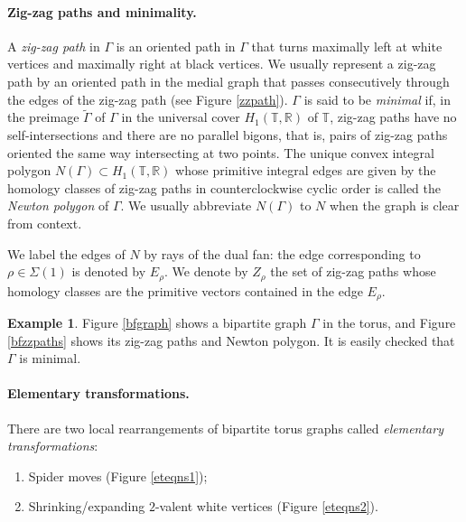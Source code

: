\documentclass[11pt]{article} %
\theoremstyle{definition}
\newtheorem{example}[theorem]{Example}
\newcommand{\R}{{\mathbb R}}
\newcommand{\T}{{\mathbb T}}
\begin{document}
\paragraph{Zig-zag paths and minimality.}
A \textit{zig-zag path} in $\Gamma$ is an oriented path in $\Gamma$ that turns maximally left at white vertices and maximally right at black vertices.  We usually represent a zig-zag path by an oriented path in the medial graph that passes consecutively through the edges of the zig-zag path (see Figure \ref{zzpath}). $\Gamma$ is said to be  \textit{minimal} if, in the preimage $\widetilde{\Gamma}$ of $\Gamma$ in the universal cover $H_1(\T,\R)$ of $\T$, zig-zag paths have no self-intersections and there are no parallel bigons, that is, pairs of zig-zag paths oriented the same way intersecting at two points. The unique convex integral polygon $N(\Gamma) \subset H_1(\mathbb T,\R)$ whose primitive integral edges are given by the homology classes of zig-zag paths in counterclockwise cyclic order is called the \textit{Newton polygon} of $\Gamma$. We usually abbreviate $N(\Gamma)$ to $N$ when the graph is clear from context.

We label the edges of $N$ by rays of the dual fan: the edge corresponding to $\rho \in \Sigma(1)$ is denoted by $E_\rho$. We denote by $Z_\rho$ the set of zig-zag paths whose homology classes are the primitive vectors contained in the edge $E_\rho$.

\begin{example}
Figure \ref{bfgraph} shows a bipartite graph $\Gamma$ in the torus, and Figure \ref{bfzzpaths} shows its zig-zag paths and Newton polygon. It is easily checked that $\Gamma$ is minimal.
\end{example}






\paragraph{Elementary transformations.}
There are two local rearrangements of bipartite torus graphs called \textit{elementary transformations}:
\begin{enumerate}
    \item Spider moves (Figure \ref{eteqns1});
    \item Shrinking/expanding $2$-valent white vertices (Figure \ref{eteqns2}).
\end{enumerate}
\end{document}
